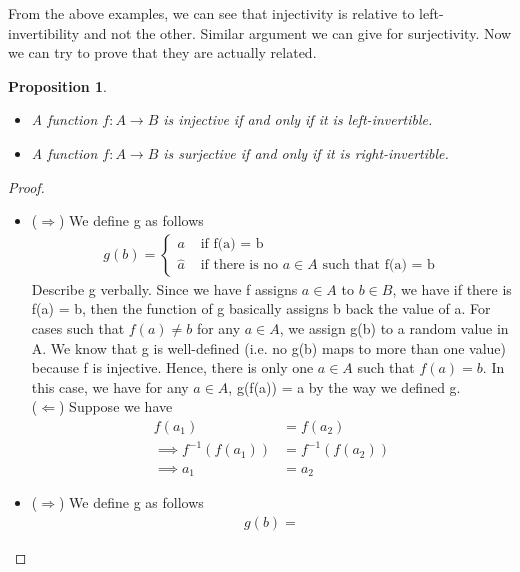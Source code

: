 \documentclass{book}
\newtheorem{proposition}[theorem]{Proposition}
\begin{document}
From the above examples, we can see that injectivity is relative to left-invertibility and not the other. Similar argument we can give for surjectivity. Now we can try to prove that they are actually related.

\begin{proposition}
    \begin{itemize}[itemsep = 0pt]
        \item[(1)] A function $f : A \rightarrow B$ is injective if and only if it is left-invertible.
        \item[(2)] A function $f : A \rightarrow B$ is surjective if and only if it is right-invertible.
    \end{itemize}
\end{proposition}

\begin{proof}
    \begin{itemize}[itemsep = 0pt]
        \item[(1)] ($\Rightarrow$) We define g as follows
        \begin{align*}
            g(b) = 
            \begin{cases}
                a & \text{ if f(a) = b} \\
                \hat{a} & \text{ if there is no } a \in A \text{ such that f(a) = b} 
            \end{cases}
        \end{align*}
        Describe g verbally. Since we have f assigns $a \in A$ to $b \in B$, we have if there is f(a) = b, then the function of g basically assigns b back the value of a. For cases such that $f(a) \neq b$ for any $a \in A$, we assign g(b) to a random value in A. We know that g is well-defined (i.e. no g(b) maps to more than one value) because f is injective. Hence, there is only one $a \in A$ such that $f(a) = b$.
        In this case, we have for any $a \in A$, g(f(a)) = a by the way we defined g. \\
        ($\Leftarrow$) Suppose we have
        \begin{align*}
            f(a_{1}) & = f(a_{2}) \\
            \implies f^{-1}(f(a_{1})) & = f^{-1}(f(a_{2})) \\
            \implies a_{1} & = a_{2}
        \end{align*}
    \item[(2)] ($\Rightarrow$) We define g as follows
        \begin{align*}
            g(b) = 

\end{align*}
\end{itemize}
\end{proof}
\end{document}
